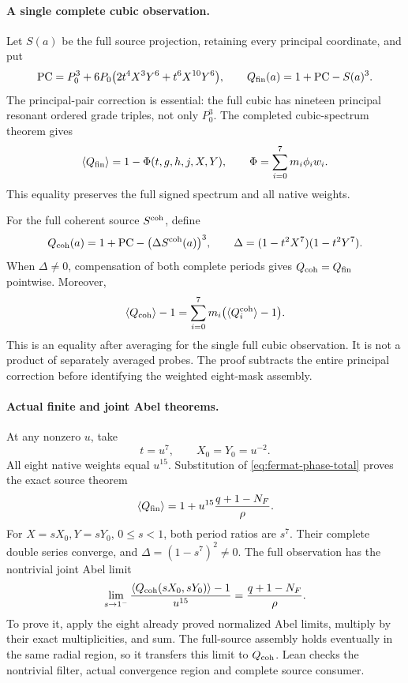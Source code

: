 \documentclass[11pt]{article}
\begin{document}
\paragraph{A single complete cubic observation.}
Let $S(a)$ be the full source projection, retaining every
principal coordinate, and put
\[
 {\rm PC}=P_0^3+
 6P_0\bigl(2t^4X^3Y^6+t^6X^{10}Y^6\bigr),\qquad
 Q_{\rm fin}(a)=1+{\rm PC}-S(a)^3.
\]
The principal-pair correction is essential: the full cubic has
nineteen principal resonant ordered grade triples, not only $P_0^3$.
The completed cubic-spectrum theorem gives
\[
 \langle Q_{\rm fin}\rangle=1-\Phi(t,g,h,j,X,Y),\qquad
 \Phi=\sum_{i=0}^7m_i\phi_iw_i.
\]
This equality preserves the full signed spectrum and all native
weights.

For the full coherent source $S^{\rm coh}$, define
\[
 Q_{\rm coh}(a)=1+{\rm PC}-
       \bigl(\Delta S^{\rm coh}(a)\bigr)^3,\qquad
 \Delta=(1-t^2X^7)(1-t^2Y^7).
\]
When $\Delta\ne0$, compensation of both complete periods gives
$Q_{\rm coh}=Q_{\rm fin}$ pointwise. Moreover,
\[
 \langle Q_{\rm coh}\rangle-1
 =\sum_{i=0}^7m_i
       \bigl(\langle Q_i^{\rm coh}\rangle-1\bigr).
\]
This is an equality after averaging for the single full cubic
observation. It is not a product of separately averaged probes.
The proof subtracts the entire principal correction before
identifying the weighted eight-mask assembly.

\paragraph{Actual finite and joint Abel theorems.}
At any nonzero $u$, take
\[
 t=u^7,\qquad X_0=Y_0=u^{-2}.
\]
All eight native weights equal $u^{15}$. Substitution of
\eqref{eq:fermat-phase-total} proves the exact source theorem
\begin{equation}
 \langle Q_{\rm fin}\rangle
   =1+u^{15}\frac{q+1-N_F}{\rho}.
 \label{eq:fermat-finite-source}
\end{equation}
For $X=sX_0,Y=sY_0$, $0\le s<1$, both period ratios are $s^7$.
Their complete double series converge, and
$\Delta=(1-s^7)^2\ne0$. The full observation has the nontrivial
joint Abel limit
\begin{equation}
 \lim_{s\to1^-}
 \frac{\langle Q_{\rm coh}(sX_0,sY_0)\rangle-1}{u^{15}}
 =\frac{q+1-N_F}{\rho}.
 \label{eq:fermat-abel-source}
\end{equation}
To prove it, apply the eight already proved normalized Abel
limits, multiply by their exact multiplicities, and sum.
The full-source assembly holds eventually in the same radial
region, so it transfers this limit to $Q_{\rm coh}$. Lean
checks the nontrivial filter, actual convergence region and
complete source consumer.
\end{document}
